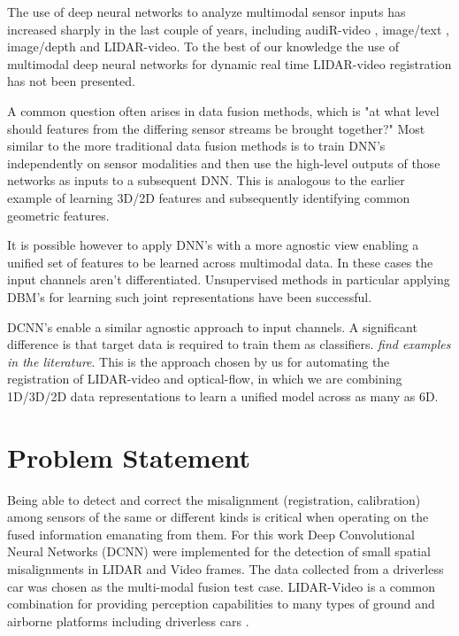 \documentclass{article}
\begin{document}
The use of deep neural networks to analyze multimodal sensor inputs  has increased sharply in the last couple of years, including audiR-video \cite{Ngiam2011Multimodal} \cite{Kim2013Deep-Learn}, image/text \cite{Srivastava2012Multimodal}, image/depth \cite{Lenz2013Deep-Learn} and LIDAR-video. To the best of our knowledge the use of multimodal deep neural networks for dynamic real time LIDAR-video registration has not been presented.

A common question often arises in data fusion methods, which is "at what level should features from the differing sensor streams be brought together?" Most similar to the more traditional data fusion methods is to train DNN's independently on sensor modalities and then use the high-level outputs of those networks as inputs to a subsequent DNN. This is analogous to the earlier example of learning 3D/2D features and subsequently identifying common geometric features. 

It is possible however to apply DNN's with a more agnostic view enabling a unified set of features to be learned across multimodal data. In these cases the input channels aren't differentiated. Unsupervised methods in particular applying DBM's for learning such joint representations have been successful.  

DCNN's enable a similar agnostic approach to input channels. A significant difference is that target data is required to train them as classifiers. \emph{find examples in the literature}. This is the approach chosen by us for automating the registration of LIDAR-video and optical-flow, in which we are combining 1D/3D/2D data representations to learn a unified model across as many as 6D. 




\section{Problem Statement} %
\label{sec:problem_statement}

Being able to detect and correct the misalignment (registration, calibration) among sensors of the same or different kinds is critical when operating on the fused information emanating from them. For this work Deep Convolutional Neural Networks (DCNN) were implemented for the detection of small spatial misalignments in LIDAR and Video frames. The data collected from a driverless car was chosen as the multi-modal fusion test case. LIDAR-Video is a common combination for providing perception capabilities to many types of ground and airborne platforms including driverless cars \cite{Thrun2011Googles-dr}. 
\end{document}
